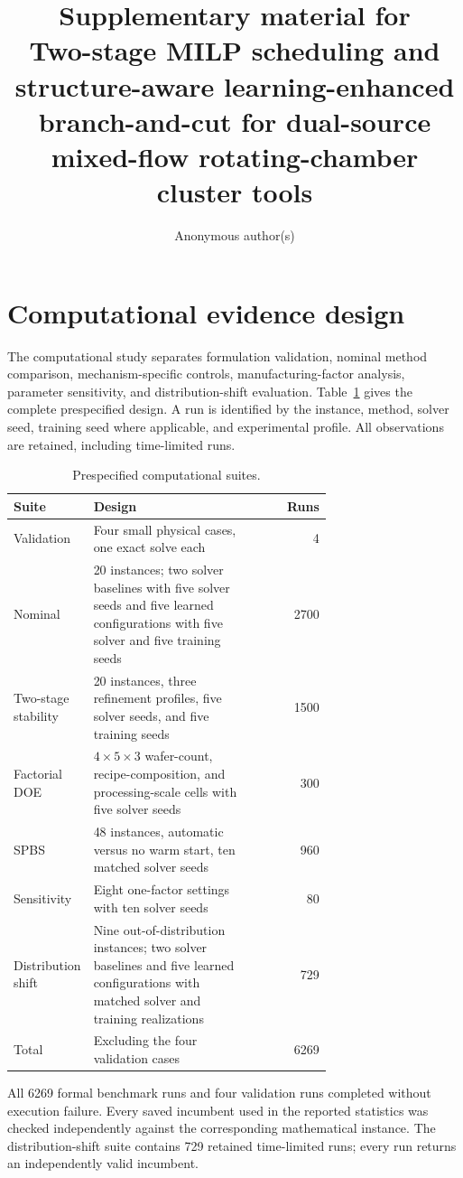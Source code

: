 \documentclass[11pt]{article}
\title{Supplementary material for\\
Two-stage MILP scheduling and structure-aware learning-enhanced branch-and-cut for dual-source mixed-flow rotating-chamber cluster tools}
\author{Anonymous author(s)}
\date{}
\begin{document}
\maketitle

\section{Computational evidence design}

The computational study separates formulation validation, nominal method
comparison, mechanism-specific controls, manufacturing-factor analysis,
parameter sensitivity, and distribution-shift evaluation. Table~\ref{tab:suites}
gives the complete prespecified design. A run is identified by the instance,
method, solver seed, training seed where applicable, and experimental profile.
All observations are retained, including time-limited runs.

\begin{table}[htbp]
\centering
\caption{Prespecified computational suites.}
\label{tab:suites}
\begin{tabular}{p{0.18\linewidth}p{0.52\linewidth}r}
\toprule
Suite & Design & Runs \\
\midrule
Validation & Four small physical cases, one exact solve each & 4 \\
Nominal & 20 instances; two solver baselines with five solver seeds and five learned configurations with five solver and five training seeds & 2700 \\
Two-stage stability & 20 instances, three refinement profiles, five solver seeds, and five training seeds & 1500 \\
Factorial DOE & $4\times5\times3$ wafer-count, recipe-composition, and processing-scale cells with five solver seeds & 300 \\
SPBS & 48 instances, automatic versus no warm start, ten matched solver seeds & 960 \\
Sensitivity & Eight one-factor settings with ten solver seeds & 80 \\
Distribution shift & Nine out-of-distribution instances; two solver baselines and five learned configurations with matched solver and training realizations & 729 \\
\midrule
Total & Excluding the four validation cases & 6269 \\
\bottomrule
\end{tabular}
\end{table}

All 6269 formal benchmark runs and four validation runs completed without
execution failure. Every saved incumbent used in the reported statistics was
checked independently against the corresponding mathematical instance. The
distribution-shift suite contains 729 retained time-limited runs; every run
returns an independently valid incumbent.
\end{document}
